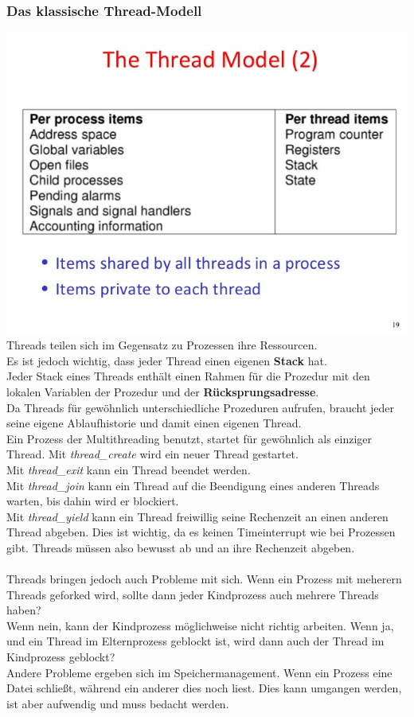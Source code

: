 \documentclass[12pt,a4paper]{univention}
\begin{document}
\subsubsection{Das klassische Thread-Modell}
\includegraphics[scale=0.5]{threadmodel.jpg}\\
Threads teilen sich im Gegensatz zu Prozessen ihre Ressourcen.\\
Es ist jedoch wichtig, dass jeder Thread einen eigenen \textbf{Stack} hat.\\
Jeder Stack eines Threads enthält einen Rahmen für die Prozedur mit den lokalen Variablen der Prozedur und der \textbf{Rücksprungsadresse}.\\
Da Threads für gewöhnlich unterschiedliche Prozeduren aufrufen, braucht jeder seine eigene Ablaufhistorie und damit einen eigenen Thread.\\
Ein Prozess der Multithreading benutzt, startet für gewöhnlich als einziger Thread. Mit \textit{thread_create} wird ein neuer Thread gestartet.\\
Mit \textit{thread_exit} kann ein Thread beendet werden. \\
Mit \textit{thread_join} kann ein Thread auf die Beendigung eines anderen Threads warten, bis dahin wird er blockiert.\\
Mit \textit{thread_yield} kann ein Thread freiwillig seine Rechenzeit an einen anderen Thread abgeben. Dies ist wichtig, da es keinen Timeinterrupt wie bei Prozessen gibt. Threads müssen also bewusst ab und an ihre Rechenzeit abgeben.\\\\
Threads bringen jedoch auch Probleme mit sich. Wenn ein Prozess mit meherern Threads geforked wird, sollte dann jeder Kindprozess auch mehrere Threads haben?\\
Wenn nein, kann der Kindprozess möglichweise nicht richtig arbeiten. Wenn ja, und ein Thread im Elternprozess geblockt ist, wird dann auch der Thread im Kindprozess geblockt?\\
Andere Probleme ergeben sich im Speichermanagement. Wenn ein Prozess eine Datei schließt, während ein anderer dies noch liest. Dies kann umgangen werden, ist aber aufwendig und muss bedacht werden.
\end{document}
